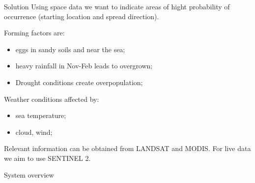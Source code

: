 \documentclass[9pt]{beamer}
\begin{document}
\begin{frame}{Solution}
Using space data we want to indicate areas of hight probability of occurrence (starting location and spread direction).

Forming factors are:
\begin{itemize}
	\item eggs in sandy soils and near the sea;
	\item {heavy rainfall in Nov-Feb leads to overgrown;}
	\item {Drought conditions create overpopulation;}
 \end{itemize} 
Weather conditions affected by:
\begin{itemize}
	\item {sea temperature;}
	\item {cloud, wind;}
 \end{itemize} 
 
Relevant information can be obtained from LANDSAT and MODIS. For live data we aim to use SENTINEL 2.

\end{frame}

\begin{frame}{System overview}

	\begin{figure} %
		

	\end{figure}
\end{frame}
\end{document}
